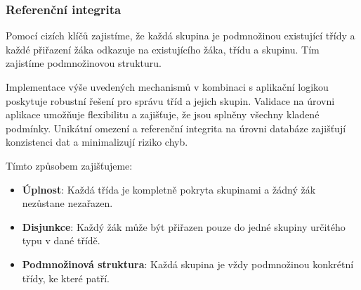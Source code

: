 \subsubsection*{Referenční integrita}

Pomocí cizích klíčů zajistíme, že každá skupina je podmnožinou existující třídy a každé přiřazení žáka odkazuje na existujícího žáka, třídu a skupinu. Tím zajistíme podmnožinovou strukturu.

Implementace výše uvedených mechanismů v kombinaci s aplikační logikou poskytuje robustní řešení pro správu tříd a jejich skupin. Validace na úrovni aplikace umožňuje flexibilitu a zajišťuje, že jsou splněny všechny kladené podmínky. Unikátní omezení a referenční integrita na úrovni databáze zajišťují konzistenci dat a minimalizují riziko chyb.

Tímto způsobem zajišťujeme:

\begin{itemize}
    \item \textbf{Úplnost}: Každá třída je kompletně pokryta skupinami a žádný žák nezůstane nezařazen.
    \item \textbf{Disjunkce}: Každý žák může být přiřazen pouze do jedné skupiny určitého typu v dané třídě.
    \item \textbf{Podmnožinová struktura}: Každá skupina je vždy podmnožinou konkrétní třídy, ke které patří.
\end{itemize}